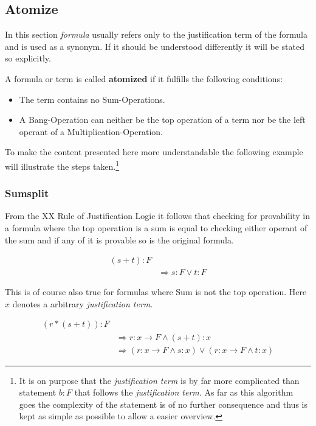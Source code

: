 \subsection{Atomize}
In this section \emph{formula} usually refers only to the justification term of the formula and is used as a synonym. If it should be understood differently it will be stated so explicitly.
\begin{definition}[atomized]
	A formula or term is called \textbf{atomized} if it fulfills the following conditions:
	\begin{itemize}
		\item The term contains no Sum-Operations.
		\item A Bang-Operation can neither be the top operation of a term nor be the left operant of a Multiplication-Operation.
	\end{itemize}	
\end{definition}
To make the content presented here more understandable the following example will illustrate the steps taken.\footnote{It is on purpose that the \emph{justification term} is by far more complicated than statement $b:F$ that follows the \emph{justification term}. As far as this algorithm goes the complexity of the statement is of no further consequence and thus is kept as simple as possible to allow a easier overview.}


\subsubsection{Sumsplit}
From the XX Rule of Justification Logic it follows that checking for provability in a formula where the top operation is a sum is equal to checking either operant of the sum and if any of it is provable so is the original formula.

\begin{equation}\label{ss1}
\begin{split}
	(s+t):F \\
	& \Rightarrow s:F \lor t:F
\end{split}
\end{equation}




This is of course also true for formulas where Sum is not the top operation. Here $x$ denotes a arbitrary \emph{justification term}.

\begin{equation}\label{ss2}
\begin{split}
	(r*(s+t)):F  \\
	& \Rightarrow r: x \rightarrow F \land (s+t): x \\
	& \Rightarrow ( r: x \rightarrow F \land s: x ) \lor ( r: x \rightarrow F \land t: x )
\end{split}
\end{equation}

